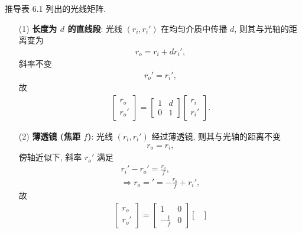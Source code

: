 \documentclass[twoside]{note}
\begin{document}
\begin{exe}
    推导表 6.1 列出的光线矩阵.
\end{exe}
\begin{pf}
    \begin{itemize}
        \item[(1)] \textbf{长度为 $d$ 的直线段}: 光线 $(r_i,r_i')$ 在均匀介质中传播 $d$, 则其与光轴的距离变为
        \begin{align}
            r_o=r_i+dr_i',
        \end{align}
        斜率不变
        \begin{align}
            r_o'=r_i',
        \end{align}
        故
        \begin{align}
            \begin{bmatrix}
                r_o\\
                r_o'
            \end{bmatrix}=\begin{bmatrix}
                1&d\\
                0&1
            \end{bmatrix}\begin{bmatrix}
                r_i\\
                r_i'
            \end{bmatrix}.
        \end{align}
        \item[(2)] \textbf{薄透镜 (焦距 $f$)}: 光线 $(r_i,r_i')$ 经过薄透镜, 则其与光轴的距离不变
        \begin{align}
            r_o=r_i,
        \end{align}
        傍轴近似下, 斜率 $r_o'$ 满足
        \begin{gather}
            r_i'-r_o'=\frac{r_o}{f},\\
            \Longrightarrow r_o='=-\frac{r_o}{f}+r_i',
        \end{gather}
        故
        \begin{align}
            \begin{bmatrix}
                r_o\\
                r_o'
            \end{bmatrix}=\begin{bmatrix}
                1&0\\
                -\frac{1}{f}&0
            \end{bmatrix}\begin{bmatrix}

\end{bmatrix}
\end{align}
\end{itemize}
\end{pf}
\end{document}
